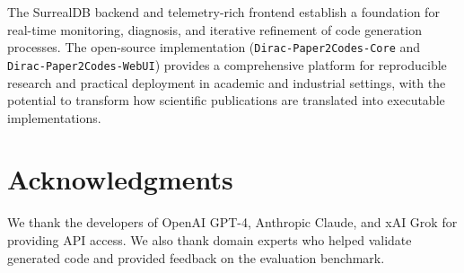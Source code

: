 \documentclass{ieeeaccess}
\begin{document}
The SurrealDB backend and telemetry-rich frontend establish a foundation for real-time monitoring, diagnosis, and iterative refinement of code generation processes. The open-source implementation (\texttt{Dirac-Paper2Codes-Core} and \texttt{Dirac-Paper2Codes-WebUI}) provides a comprehensive platform for reproducible research and practical deployment in academic and industrial settings, with the potential to transform how scientific publications are translated into executable implementations.

\section*{Acknowledgments}
We thank the developers of OpenAI GPT-4, Anthropic Claude, and xAI Grok for providing API access. We also thank domain experts who helped validate generated code and provided feedback on the evaluation benchmark.
\end{document}
